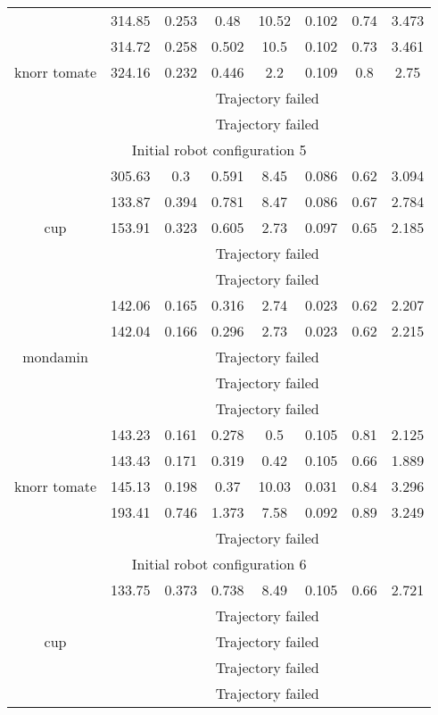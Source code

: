 {\begin{center}
\begin{longtable}[c]{ | c | c | c | c | c | c | c || c || }
\multirow{5}{1.5cm}{knorr tomate}& 314.85 & 0.253 & 0.48 & 10.52 & 0.102 & 0.74 & 3.473 \\
& 314.72 & 0.258 & 0.502 & 10.5 & 0.102 & 0.73 & 3.461 \\
& 324.16 & 0.232 & 0.446 & 2.2 & 0.109 & 0.8 & 2.75 \\
& \multicolumn{7}{c|}{Trajectory failed} \\
& \multicolumn{7}{c|}{Trajectory failed} \\
\hline 
\multicolumn{8}{|c|}{Initial robot configuration 5} \\
\hline
\multirow{5}{1.5cm}{cup}& 305.63 & 0.3 & 0.591 & 8.45 & 0.086 & 0.62 & 3.094 \\
& 133.87 & 0.394 & 0.781 & 8.47 & 0.086 & 0.67 & 2.784 \\
& 153.91 & 0.323 & 0.605 & 2.73 & 0.097 & 0.65 & 2.185 \\
& \multicolumn{7}{c|}{Trajectory failed} \\
& \multicolumn{7}{c|}{Trajectory failed} \\
\hline 
\multirow{5}{1.5cm}{mondamin}& 142.06 & 0.165 & 0.316 & 2.74 & 0.023 & 0.62 & 2.207 \\
& 142.04 & 0.166 & 0.296 & 2.73 & 0.023 & 0.62 & 2.215 \\
& \multicolumn{7}{c|}{Trajectory failed} \\
& \multicolumn{7}{c|}{Trajectory failed} \\
& \multicolumn{7}{c|}{Trajectory failed} \\
\hline 
\multirow{5}{1.5cm}{knorr tomate}& 143.23 & 0.161 & 0.278 & 0.5 & 0.105 & 0.81 & 2.125 \\
& 143.43 & 0.171 & 0.319 & 0.42 & 0.105 & 0.66 & 1.889 \\
& 145.13 & 0.198 & 0.37 & 10.03 & 0.031 & 0.84 & 3.296 \\
& 193.41 & 0.746 & 1.373 & 7.58 & 0.092 & 0.89 & 3.249 \\
& \multicolumn{7}{c|}{Trajectory failed} \\
\hline 
\multicolumn{8}{|c|}{Initial robot configuration 6} \\
\hline
\multirow{5}{1.5cm}{cup}& 133.75 & 0.373 & 0.738 & 8.49 & 0.105 & 0.66 & 2.721 \\
& \multicolumn{7}{c|}{Trajectory failed} \\
& \multicolumn{7}{c|}{Trajectory failed} \\
& \multicolumn{7}{c|}{Trajectory failed} \\
& \multicolumn{7}{c|}{Trajectory failed} \\

\end{longtable}
\end{center}}
